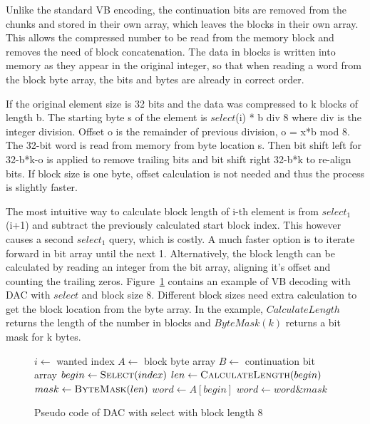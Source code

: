 Unlike the standard VB encoding, the continuation bits are removed from the chunks and stored in their own array, which leaves the blocks in their own array. This allows the 
compressed number to be read from the memory block and removes the need of block concatenation. The data in blocks is written into memory as they appear in the original integer, so that 
when reading a word from the block byte array, the bits and bytes are already in correct order. 

If the original element size is 32 bits and the data was compressed to k blocks of length b. The starting byte s of the element is $select$(i) * b div 8 where div is the integer division. 
Offset o is the remainder of previous division, o = x*b mod 8. The 32-bit word is read from memory from byte location s. Then bit shift left for 32-b*k-o is applied to remove trailing 
bits and bit shift right 32-b*k to re-align bits. If block size is one byte, offset calculation is not needed and thus the process is slightly faster.

The most intuitive way to calculate block length of i-th element is from $select_1$(i+1) and subtract the previously calculated start block index. This however causes a second 
$select_1$ query, which is costly. A much faster option is to iterate forward in bit array until the next 1. Alternatively, the block length can be calculated by reading an integer 
from the bit array, aligning it's offset and counting the trailing zeros. Figure~\ref{select_pseudo} contains an example of VB decoding with DAC with $select$ and block size 8. 
Different block sizes need extra calculation to get the block location from the byte array. In the example, $CalculateLength$ returns the length of the number in blocks and $ByteMask(k)$ returns 
a bit mask for k bytes. 

\begin{figure}[ht]
\centering
\begin{algorithmic}
\State $i \gets $ wanted index
\State $A \gets $ block byte array
\State $B \gets $ continuation bit array
\State $begin \gets \Call{Select}{index}$
\State $len \gets \Call{CalculateLength}{begin}$
\State $mask \gets \Call{ByteMask}{len}$
\State $word \gets A[begin]$ 
\State $word \gets word \mathbin{\&} mask$ 


\end{algorithmic}
\caption{Pseudo code of DAC with select with block length 8} \label{select_pseudo}
\end{figure}

